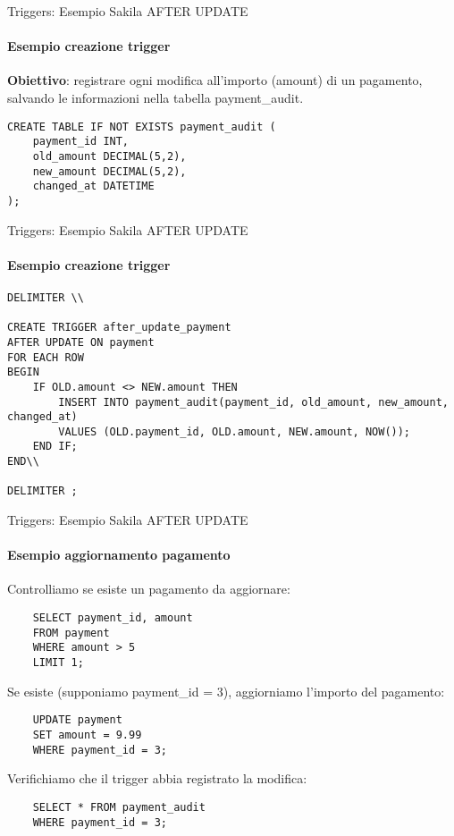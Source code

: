 %
\begin{frame}[fragile]{Triggers: Esempio Sakila AFTER UPDATE}
\framesubtitle{Esempio creazione trigger}
\vspace{-.5cm}
\textbf{Obiettivo}: registrare ogni modifica all'importo (amount) di un pagamento, salvando le informazioni nella tabella payment\_audit.

\begin{lstlisting}
CREATE TABLE IF NOT EXISTS payment_audit (
    payment_id INT,
    old_amount DECIMAL(5,2),
    new_amount DECIMAL(5,2),
    changed_at DATETIME
);
\end{lstlisting}
\end{frame}
%
\begin{frame}[fragile]{Triggers: Esempio Sakila AFTER UPDATE}
\framesubtitle{Esempio creazione trigger}
\vspace{-.5cm}

\begin{lstlisting}
DELIMITER \\

CREATE TRIGGER after_update_payment
AFTER UPDATE ON payment
FOR EACH ROW
BEGIN
    IF OLD.amount <> NEW.amount THEN
        INSERT INTO payment_audit(payment_id, old_amount, new_amount, changed_at)
        VALUES (OLD.payment_id, OLD.amount, NEW.amount, NOW());
    END IF;
END\\

DELIMITER ;
\end{lstlisting}
\end{frame}
%
\begin{frame}[fragile]{Triggers: Esempio Sakila AFTER UPDATE}
\framesubtitle{Esempio aggiornamento pagamento}
\vspace{-.5cm}

Controlliamo se esiste un pagamento da aggiornare:
\begin{lstlisting}
    SELECT payment_id, amount
    FROM payment
    WHERE amount > 5
    LIMIT 1;
\end{lstlisting}

Se esiste (supponiamo payment\_id = 3), aggiorniamo l'importo del pagamento:
\begin{lstlisting}
    UPDATE payment
    SET amount = 9.99
    WHERE payment_id = 3;
\end{lstlisting}

Verifichiamo che il trigger abbia registrato la modifica:
\begin{lstlisting}
    SELECT * FROM payment_audit
    WHERE payment_id = 3;
\end{lstlisting}

\end{frame}
